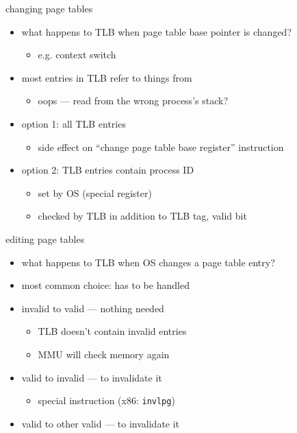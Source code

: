 \begin{frame}{changing page tables}
\begin{itemize}
\item what happens to TLB when page table base pointer is changed?
    \begin{itemize}
    \item e.g. context switch
    \end{itemize}
\item most entries in TLB refer to things from 
    \begin{itemize}
    \item oops --- read from the wrong process's stack?
    \end{itemize}
\vspace{.5cm}
\item<2-> option 1:  all TLB entries
    \begin{itemize}
    \item side effect on ``change page table base register'' instruction
    \end{itemize}
\item<3-> option 2: TLB entries contain process ID
    \begin{itemize}
    \item set by OS (special register)
    \item checked by TLB in addition to TLB tag, valid bit
    \end{itemize}
\end{itemize}
\end{frame}

\begin{frame}{editing page tables}
\begin{itemize}
\item what happens to TLB when OS changes a page table entry?
\item most common choice: has to be handled 
\vspace{.5cm}
\item<2-> invalid to valid --- nothing needed
    \begin{itemize}
    \item TLB doesn't contain invalid entries
    \item MMU will check memory again
    \end{itemize}
\item<2-> valid to invalid ---  to invalidate it
    \begin{itemize}
    \item special instruction (x86: {\tt invlpg})
    \end{itemize}
\item<2-> valid to other valid ---  to invalidate it
\end{itemize}
\end{frame}
